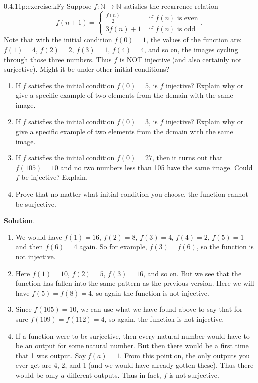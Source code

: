 \documentclass[twoside,11pt,]{book}
\newcommand{\blocktitlefont}{\relax}
\numberwithin{equation}{chapter}
\newcommand{\N}{\mathbb N}
\newcommand{\amp}{&}
\begin{document}
\begin{divisionsolution}{0.4.11}{}{p:exercise:kFy}%
Suppose \(f:\N \to \N\) satisfies the recurrence relation%
\begin{equation*}
f(n+1) = \begin{cases} \frac{f(n)}{2} \amp \text{ if } f(n) \text{ is even} \\ 3f(n) + 1 \amp \text{ if } f(n) \text{ is odd}\end{cases}\text{.}
\end{equation*}
Note that with the initial condition \(f(0) = 1\), the values of the function are: \(f(1) = 4\), \(f(2) = 2\), \(f(3) = 1\), \(f(4) = 4\), and so on, the images cycling through those three numbers. Thus \(f\) is NOT injective (and also certainly not surjective). Might it be under other initial conditions?\footnotemark{}%
\begin{enumerate}[label=(\alph*)]
\item{}If \(f\) satisfies the initial condition \(f(0) = 5\), is \(f\) injective? Explain why or give a specific example of two elements from the domain with the same image.%
\item{}If \(f\) satisfies the initial condition \(f(0) = 3\), is \(f\) injective? Explain why or give a specific example of two elements from the domain with the same image.%
\item{}If \(f\) satisfies the initial condition \(f(0) = 27\), then it turns out that \(f(105) = 10\) and no two numbers less than 105 have the same image. Could \(f\) be injective? Explain.%
\item{}Prove that no matter what initial condition you choose, the function cannot be surjective.%
\end{enumerate}
%
\par\smallskip%
\noindent\textbf{\blocktitlefont Solution}.\quad{}%
\begin{enumerate}[label=(\alph*)]
\item{}We would have \(f(1) = 16\), \(f(2) = 8\), \(f(3) = 4\), \(f(4) = 2\), \(f(5) = 1\) and then \(f(6) = 4\) again. So for example, \(f(3) = f(6)\), so the function is not injective.%
\item{}Here \(f(1) = 10\), \(f(2) = 5\), \(f(3) = 16\), and so on. But we see that the function has fallen into the same pattern as the previous version. Here we will have \(f(5) = f(8) = 4\), so again the function is not injective.%
\item{}Since \(f(105) = 10\), we can use what we have found above to say that for sure \(f(109) = f(112) = 4\), so again, the function is not injective.%
\item{}If a function were to be surjective, then every natural number would have to be an output for some natural number. But then there would be a first time that 1 was output. Say \(f(a) = 1\). From this point on, the only outputs you ever get are 4, 2, and 1 (and we would have already gotten these). Thus there would be only \(a\) different outputs. Thus in fact, \(f\) is not surjective.%
\end{enumerate}
%
\end{divisionsolution}%
\end{document}
